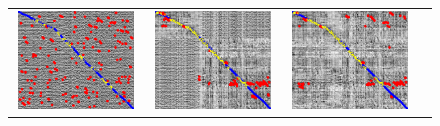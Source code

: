 \documentclass[letterpaper, 10 pt, conference]{ieeeconf}  %
\begin{document}
\newcommand{\imgH}{2.6cm}
\newcommand{\imgW}{4cm}
\begin{figure}
\centering
 \begin{tabular*}{\textwidth}[t]{cccc}
  \includegraphics[width=\imgW,height=\imgH]{campus-io-without-bad-101} &
  \includegraphics[width=\imgW,height=\imgH]{campus-io-with-bad-71} &
  \includegraphics[width=\imgW,height=\imgH]{campus-io-without-good-105} &

\end{tabular*}
\end{figure}
\end{document}
